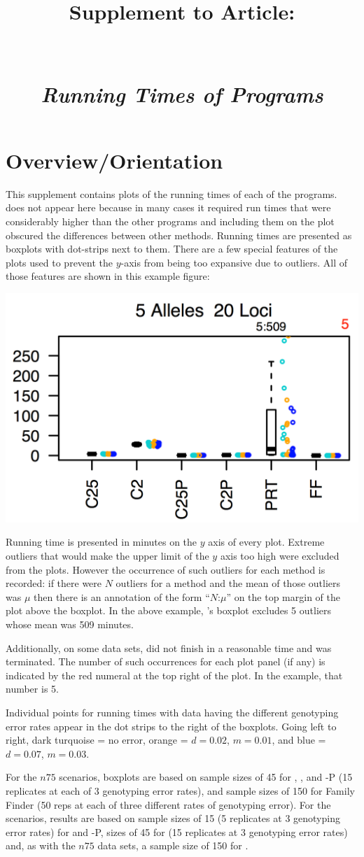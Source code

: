 \documentclass[11pt,landscape]{report}
\title{Supplement \SupNum{} to Article:\\
\ArticleName\\
\mbox{}\\
{\em Running Times of Programs}}
\begin{document}
\maketitle
\section{Overview/Orientation}
This supplement contains plots of the running times of each of the programs. \kinalyzer{} does not appear here because in many cases it required run times that were considerably higher than the other programs and including them on the plot obscured the differences between other methods. 
Running times are presented as boxplots with dot-strips next to them.  There are a few special features of the plots used to prevent the $y$-axis from being too expansive due to outliers.   All of those features are shown in this example figure: 
\begin{center}
\includegraphics[width=.4\textwidth]{suppl4_example_noki.png}
\end{center}
Running time is presented in minutes on the $y$ axis of every plot.  Extreme outliers that would make the upper limit of the $y$ axis too high were excluded from the plots.  However the occurrence of such outliers for each method is recorded: if there were $N$ outliers for a method and the mean of those outliers was $\mu$ then there is an annotation of the form  ``$N$:$\mu$'' on the top margin of the plot above the boxplot.  In the above example, \prt{}'s boxplot excludes 5 outliers whose mean was 509 minutes.

Additionally, on some data sets, \prt{} did not finish in a reasonable time and was terminated.  The number of such occurrences for each plot panel (if any) is indicated by the red numeral at the top right of the plot.  In the example, that number is 5.

Individual points for running times with data having the different genotyping error rates appear in the dot strips to the right of the boxplots.  Going left to right, dark turquoise =  no error, orange = $d=0.02$, $m=0.01$, and blue = $d=0.07$, $m=0.03$.


For the $n75$ scenarios, boxplots are based on sample sizes of 45 for \prt{}, \colony{}, and \colony{}-P (15 replicates at each of 3 genotyping error rates),  and sample sizes of 150 for Family Finder (50 reps at each of three different rates of genotyping error).  For the \lottalarge{} scenarios, results are based on sample sizes of 15 (5 replicates at 3 genotyping error rates) for \colony{} and \colony-P{}, sizes of 45 for \prt{} (15 replicates at 3 genotyping error rates) and, as with the $n75$ data sets, a sample size of 150 for \familyfinder{}. 
\end{document}
